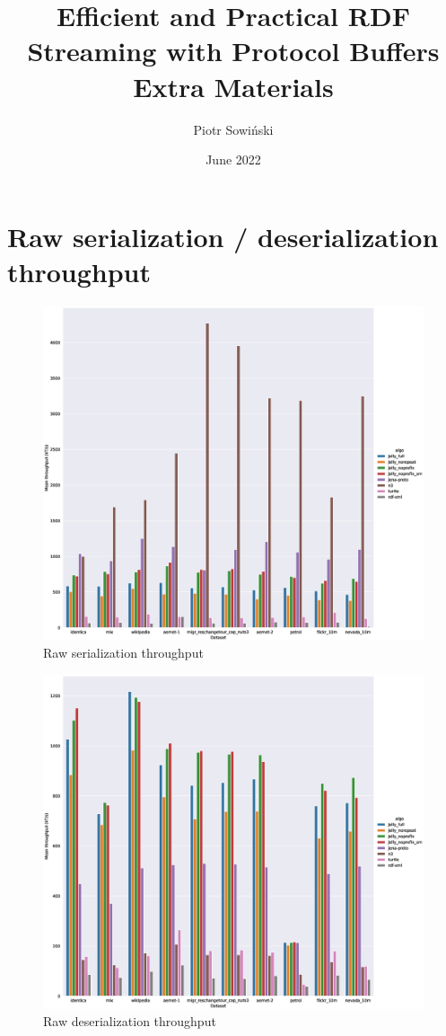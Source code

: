 \documentclass{article}
\title{Efficient and Practical RDF Streaming with Protocol Buffers \\ \large{Extra Materials}}
\author{Piotr Sowiński}
\date{June 2022}
\begin{document}
\maketitle

\section{Raw serialization / deserialization throughput}


\begin{figure}[h!]
    \centering
    \includegraphics[width=20cm]{img/raw_ser.eps}
    \caption{Raw serialization throughput}
\end{figure}



\begin{figure}[h!]
    \centering
    \includegraphics[width=20cm]{img/raw_des.eps}
    \caption{Raw deserialization throughput}
\end{figure}
\end{document}

